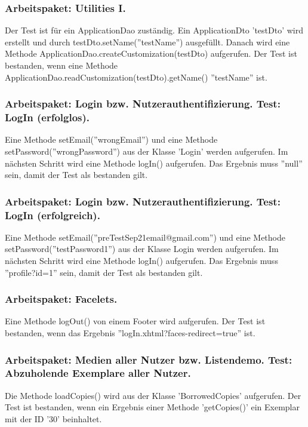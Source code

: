 \documentclass{article}
\begin{document}
\subsubsection{Arbeitspaket: Utilities I.}
Der Test ist für ein ApplicationDao zuständig. Ein ApplicationDto 'testDto' wird erstellt und durch testDto.setName(''testName'') ausgefüllt. Danach wird eine Methode \linebreak ApplicationDao.createCustomization(testDto) aufgerufen. Der Test ist bestanden, wenn eine Methode ApplicationDao.readCustomization(testDto).getName() ''testName'' ist.

\subsubsection{Arbeitspaket: Login bzw. Nutzerauthentifizierung. Test: LogIn (erfolglos).}
Eine Methode setEmail(''wrongEmail'') und eine Methode setPassword(''wrongPassword'') aus der Klasse 'Login' werden aufgerufen. Im nächsten Schritt wird eine Methode logIn() aufgerufen. Das Ergebnis muss ''null'' sein, damit der Test als bestanden gilt. 

\subsubsection{Arbeitspaket: Login bzw. Nutzerauthentifizierung. Test: LogIn (erfolgreich).}
Eine Methode setEmail(''preTestSep21email@gmail.com'') und eine Methode \linebreak setPassword(''testPassword1'') aus der Klasse Login werden aufgerufen. Im nächsten Schritt wird eine Methode logIn() aufgerufen. Das Ergebnis muss ''profile?id=1'' sein, damit der Test als bestanden gilt.

\subsubsection{Arbeitspaket: Facelets.}
Eine Methode logOut() von einem Footer wird aufgerufen. Der Test ist bestanden, wenn das Ergebnis ''logIn.xhtml?faces-redirect=true'' ist.

\subsubsection{Arbeitspaket: Medien aller Nutzer bzw. Listendemo. Test: Abzuholende Exemplare aller Nutzer.}
Die Methode loadCopies() wird aus der Klasse 'BorrowedCopies' aufgerufen. Der Test ist bestanden, wenn ein Ergebnis einer Methode 'getCopies()' ein Exemplar mit der ID '30' beinhaltet.
\end{document}
